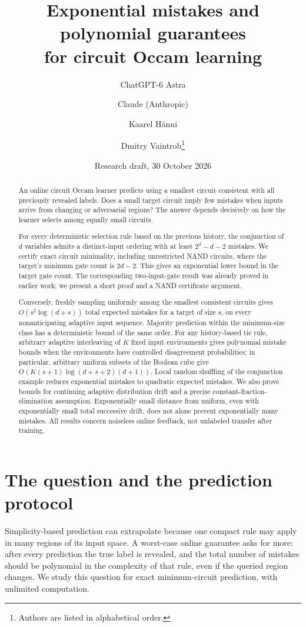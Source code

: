\documentclass[11pt]{article}
\title{Exponential mistakes and polynomial guarantees\\for circuit Occam learning}
\author{ChatGPT-6 Astra \and Claude (Anthropic) \and Kaarel H\"anni \and Dmitry Vaintrob\thanks{Authors are listed in alphabetical order.}}
\date{Research draft, 30 October 2026}
\begin{document}
\maketitle
\begin{abstract}
An online circuit Occam learner predicts using a smallest circuit
consistent with all previously revealed labels. Does a small target
circuit imply few mistakes when inputs arrive from changing or adversarial
regions? The answer depends decisively on how the learner selects among
equally small circuits.

For every deterministic selection rule based on the previous history,
the conjunction of $d$ variables admits a distinct-input ordering with at
least $2^d-d-2$ mistakes. We certify exact circuit minimality, including
unrestricted NAND circuits, where the target's minimum gate count is
$2d-2$. This gives an exponential lower bound in the target gate count.
The corresponding two-input-gate result was already proved in earlier
work; we present a short proof and a NAND certificate argument.

Conversely, freshly sampling uniformly among the smallest consistent
circuits gives $O(s^2\log(d+s))$ total expected mistakes for a target of
size $s$, on every nonanticipating adaptive input sequence. Majority
prediction within the minimum-size class has a deterministic bound of
the same order. For any history-based tie rule, arbitrary adaptive
interleaving of $K$ fixed input environments gives polynomial mistake
bounds when the environments have controlled disagreement probabilities;
in particular, arbitrary uniform subsets of the Boolean cube give
$O(K(s+1)\log(d+s+2)(d+1))$. Local random shuffling of the conjunction
example reduces exponential mistakes to quadratic expected mistakes.
We also prove bounds for continuing adaptive distribution drift and a
precise constant-fraction-elimination assumption. Exponentially small
distance from uniform, even with exponentially small total successive
drift, does not alone prevent exponentially many mistakes. All results concern
noiseless online feedback, not unlabeled transfer after training.
\end{abstract}

\section{The question and the prediction protocol}

Simplicity-based prediction can extrapolate because one compact rule may
apply in many regions of its input space. A worst-case online guarantee
asks for more: after every prediction the true label is revealed, and
the total number of mistakes should be polynomial in the complexity of
that rule, even if the queried region changes. We study this question for
exact minimum-circuit prediction, with unlimited computation.
\end{document}
